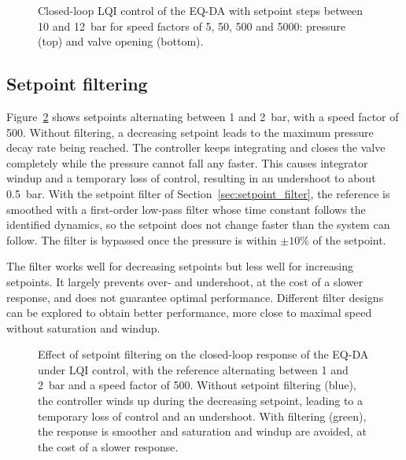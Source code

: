 \documentclass[12pt,a4paper]{article}
\begin{document}
\begin{figure}[ht!]
    \centering
    
    \caption{Closed-loop LQI control of the EQ-DA with setpoint steps between 10 and 12~bar for speed factors of 5, 50, 500 and 5000: pressure (top) and valve opening (bottom).}
    \label{fig:multiple_setpoints}
\end{figure}

\clearpage
\subsection{Setpoint filtering}
Figure~\ref{fig:setpoint_filtering} shows setpoints alternating between 1 and 2~bar, with a speed factor of 500. Without filtering, a decreasing setpoint leads to the maximum pressure decay rate being reached. The controller keeps integrating and closes the valve completely while the pressure cannot fall any faster. This causes integrator windup and a temporary loss of control, resulting in an undershoot to about 0.5~bar. With the setpoint filter of Section~\ref{sec:setpoint_filter}, the reference is smoothed with a first-order low-pass filter whose time constant follows the identified dynamics, so the setpoint does not change faster than the system can follow. The filter is bypassed once the pressure is within $\pm10\%$ of the setpoint.

The filter works well for decreasing setpoints but less well for increasing setpoints. It largely prevents over- and undershoot, at the cost of a slower response, and does not guarantee optimal performance. Different filter designs can be explored to obtain better performance, more close to maximal speed without saturation and windup.

\begin{figure}[ht!]
    \centering
    
    \caption{Effect of setpoint filtering on the closed-loop response of the EQ-DA under LQI control, with the reference alternating between 1 and 2~bar and a speed factor of 500. Without setpoint filtering (blue), the controller winds up during the decreasing setpoint, leading to a temporary loss of control and an undershoot. With filtering (green), the response is smoother and saturation and windup are avoided, at the cost of a slower response.}
    \label{fig:setpoint_filtering}
\end{figure}

\end{document}
